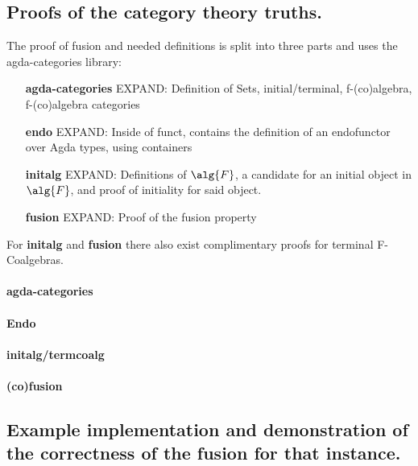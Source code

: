 \subsection{Proofs of the category theory truths.}\label{sec:cat_truths}
The proof of fusion and needed definitions is split into three parts and uses the agda-categories library: %
\begin{itemize}
    \item[\textbf{agda-categories}] EXPAND: Definition of Sets, initial/terminal, f-(co)algebra, f-(co)algebra categories
    \item[\textbf{endo}] EXPAND: Inside of funct, contains the definition of an endofunctor over Agda types, using containers
    \item[\textbf{initalg}] EXPAND: Definitions of $\alg{F}$, a candidate for an initial object in $\alg{F}$, and proof of initiality for said object.
    \item[\textbf{fusion}] EXPAND: Proof of the fusion property
\end{itemize}
For \textbf{initalg} and \textbf{fusion} there also exist complimentary proofs for terminal F-Coalgebras.

\paragraph{agda-categories}
\paragraph{Endo}
\paragraph{initalg/termcoalg}
\paragraph{(co)fusion}


\subsection{Example implementation and demonstration of the correctness of the fusion for that instance.}
\fi










\iffalse
Outline:
- Harper's work has some mathematics in it, I formalized it.
- The formalization was done in two parts:
  - The formalization of the mathematics itself
  - The formalization of the mathematics, embedded in categories to leverage the fusion property
- The Formalization also implemented an example datastructure to demonstrate the proof's applicability in practice.
\fi


